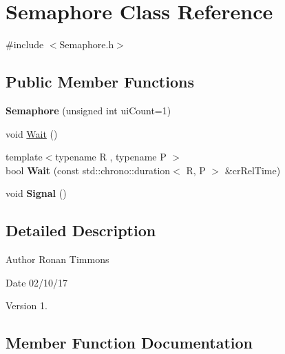 \hypertarget{classSemaphore}{}\section{Semaphore Class Reference}
\label{classSemaphore}


{\ttfamily \#include $<$Semaphore.\+h$>$}

\subsection*{Public Member Functions}
\begin{DoxyCompactItemize}
\item 
{\bfseries Semaphore} (unsigned int ui\+Count=1)\hypertarget{classSemaphore_aed0c7b79cde302307df0f368739fe569}{}\label{classSemaphore_aed0c7b79cde302307df0f368739fe569}

\item 
void \hyperlink{classSemaphore_a72aabebf026e3a8b1f3e4d0fa8ee1eda}{Wait} ()
\item 
{\footnotesize template$<$typename R , typename P $>$ }\\bool {\bfseries Wait} (const std\+::chrono\+::duration$<$ R, P $>$ \&cr\+Rel\+Time)\hypertarget{classSemaphore_a7f700173ae86ae623684109066e07656}{}\label{classSemaphore_a7f700173ae86ae623684109066e07656}

\item 
void {\bfseries Signal} ()\hypertarget{classSemaphore_a86f92f738b4486439b296d8e235895f2}{}\label{classSemaphore_a86f92f738b4486439b296d8e235895f2}

\end{DoxyCompactItemize}


\subsection{Detailed Description}
\begin{DoxyAuthor}{Author}
Ronan Timmons 
\end{DoxyAuthor}
\begin{DoxyDate}{Date}
02/10/17 
\end{DoxyDate}
\begin{DoxyVersion}{Version}
1. 
\end{DoxyVersion}


\subsection{Member Function Documentation}
